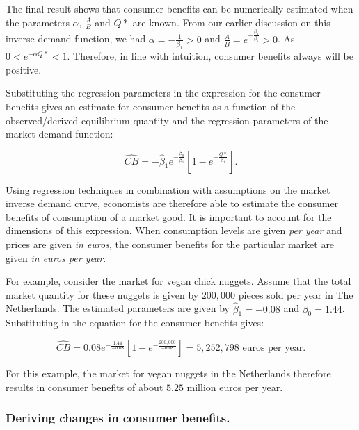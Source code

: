 \documentclass[
]{book}
\begin{document}
The final result shows that consumer benefits can be numerically estimated when the parameters \(\alpha\), \(\frac{A}{B}\) and \(Q\ast\) are known. From our earlier discussion on this inverse demand function, we had \(\alpha=-\frac{1}{\beta_1} >0\) and \(\frac{A}{B}=e^{-\frac{\beta_0}{\beta_1}} >0\). As \(0 < e^{-\alpha Q\ast} <1\). Therefore, in line with intuition, consumer benefits always will be positive.

Substituting the regression parameters in the expression for the consumer benefits gives an estimate for consumer benefits as a function of the observed/derived equilibrium quantity and the regression parameters of the market demand function:

\begin{equation}
\widehat{CB} = -\hat{\beta}_1 e^{-\frac{\beta_0}{\beta_1}}\left[1- e^{-\frac{Q\ast}{\beta_1}} \right].
\end{equation}

Using regression techniques in combination with assumptions on the market inverse demand curve, economists are therefore able to estimate the consumer benefits of consumption of a market good. It is important to account for the dimensions of this expression. When consumption levels are given \emph{per year} and prices are given \emph{in euros}, the consumer benefits for the particular market are given \emph{in euros per year}.

For example, consider the market for vegan chick nuggets. Assume that the total market quantity for these nuggets is given by \(200,000\) pieces sold per year in The Netherlands. The estimated parameters are given by \(\hat{\beta}_1=-0.08\) and \(\beta_0 =1.44\). Substituting in the equation for the consumer benefits gives:

\begin{equation}
\widehat{CB} = 0.08 e^{-\frac{1.44}{-0.08}}\left[1- e^{-\frac{200,000}{-0.08}} \right] = 5,252,798 \text{ euros per year}.
\end{equation}

For this example, the market for vegan nuggets in the Netherlands therefore results in consumer benefits of about \(5.25\) million euros per year.

\hypertarget{deriving-changes-in-consumer-benefits.}{%
\subsubsection{Deriving changes in consumer benefits.}\label{deriving-changes-in-consumer-benefits.}}
\end{document}
